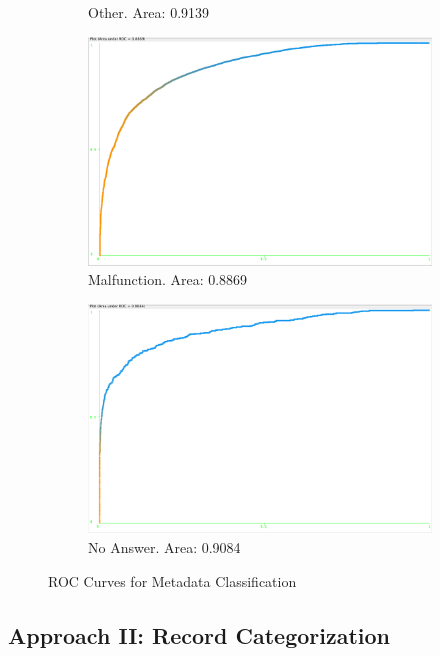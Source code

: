 \documentclass[11pt, notitlepage,abstracton,oneside]{article}   	%
\begin{document}
\begin{figure}[H]
\begin{subfigure}[b]{0.3\textwidth}
        \caption{Other. Area: 0.9139}
        \label{fig:other}
    \end{subfigure}    
    \begin{subfigure}[b]{0.4\textwidth}
        \centering
        \includegraphics[width=\textwidth]{figures/malfunction}
        \caption{Malfunction. Area: 0.8869}
        \label{fig:injury}
    \end{subfigure} 
    \begin{subfigure}[b]{0.4\textwidth}
        \centering
        \includegraphics[width=\textwidth]{figures/no-answer}
        \caption{No Answer. Area: 0.9084}
        \label{fig:no-figure}
    \end{subfigure}          
    \caption{ROC Curves for Metadata Classification}
    \label{fig:ROC Curves}
\end{figure}

\subsection{Approach II: Record Categorization}
\end{document}

